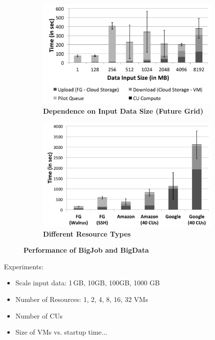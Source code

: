 \documentclass[times]{cpeauth}
\begin{document}
\begin{figure}[htbp]
    \begin{subfigure}[b]{0.5\textwidth}
	\centering
		\includegraphics[width=\textwidth]{performance/pd_fg_input_size.pdf}
	\caption{\textbf{Dependence on Input Data Size (Future Grid)}}
	\label{fig:performance_pd_google_aws}
   \end{subfigure}
   \begin{subfigure}[b]{0.5\textwidth}
	\centering
	\includegraphics[width=\textwidth]{performance/pd_google_aws.pdf}
	\caption{\textbf{Different Resource Types}}
	\end{subfigure}
	\caption{\textbf{Performance of BigJob and BigData}}
\end{figure}



Experiments:
\begin{itemize}
	\item Scale input data: 1\,GB, 10GB, 100GB, 1000 GB
	\item Number of Resources: 1, 2, 4, 8, 16, 32 VMs
	\item Number of CUs
	\item Size of VMs vs. startup time...
\end{itemize}
\end{document}
